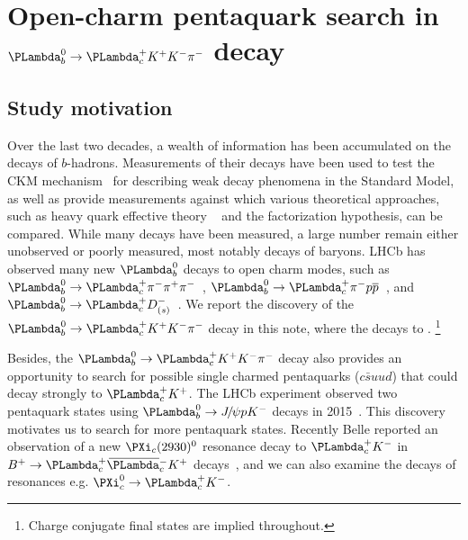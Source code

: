 \newcommand{\LbLck}{\ensuremath{\Lb\to\Lc\Km}\xspace}
\newcommand{\LbLcpppi}{\ensuremath{\Lb\to\Lc\proton\antiproton\pim}\xspace}
\newcommand{\LbLckkpi}{\ensuremath{\Lb\to\Lc\Kp\Km\pim}\xspace}
\newcommand{\LbLcDs}{\ensuremath{\Lb\to\Lc\Dsm}\xspace}
\newcommand{\LbLcDskkpi}{\ensuremath{\Lb\to\Lc\Dsm;\Dsm\to\Kp\Km\pim}\xspace}
\newcommand{\Dskkpi}{\ensuremath{\Dsm\to\Kp\Km\pim}\xspace}


\chapter{Open-charm pentaquark search in $\Lb\to\Lc\Kp\Km\pim$ decay}
\label{chap:open_pentaquark}



\section{Study motivation}

Over the last two decades, a wealth of information has been accumulated on the decays of $b$-hadrons.
Measurements of their decays have been used to test the CKM mechanism~\cite{PhysRevLett.10.531} for describing weak decay phenomena in the Standard Model, 
as well as provide measurements against which various theoretical approaches, 
such as heavy quark effective theory ~\cite{EICHTEN1990511} and the factorization hypothesis, can be compared.
While many decays have been measured, 
a large number remain either unobserved or poorly measured, most notably decays of \Lb baryons.
LHCb has observed many new $\Lb$ decays to open charm modes, 
such as $\Lb\to\Lc\pi^-\pi^+\pi^-$~\cite{LHCb-PAPER-Define}, 
$\Lb\to\Lc \pi^- \proton \antiproton$~\cite{LHCb-PAPER-2018-005}, 
and $\Lb\to \Lc D^-_{(s)}$~\cite{LHCb-PAPER-2014-002}. 
We report the discovery of the \LbLckkpi decay in this note, where the \Lc decays to \Pp \Km \pip.
\footnote{Charge conjugate final states are implied throughout.}

Besides, 
the $\LbLckkpi$ decay also provides an opportunity to search for possible single charmed pentaquarks ($c\bar{s}uud$) 
that could decay strongly to $\Lc\Kp$.
The LHCb experiment observed two pentaquark states using $\Lb\to \jpsi p K^-$ decays in 2015~\cite{LHCb-PAPER-2015-029}.
This discovery motivates us to search for more pentaquark states.
Recently Belle reported an observation of a new $\Xic(2930)^0$ resonance decay to $\Lc\Km$ in $\Bu\to \Lc\Lcbar \Kp$ decays~\cite{Li:2017uvv}, 
and we can also examine the decays of resonances e.g. $\Xicz\to \Lc\Km$.


